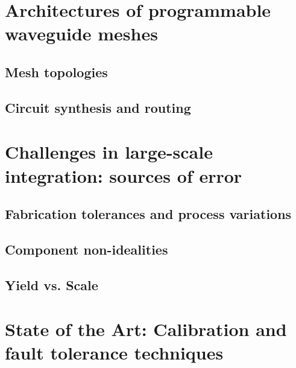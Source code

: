 \section{Architectures of programmable waveguide meshes}
\subsection{Mesh topologies}
\subsection{Circuit synthesis and routing}

\section{Challenges in large-scale integration: sources of error}
\subsection{Fabrication tolerances and process variations}

\subsection{Component non-idealities}

\subsection{Yield vs. Scale}


\section{State of the Art: Calibration and fault tolerance techniques}


